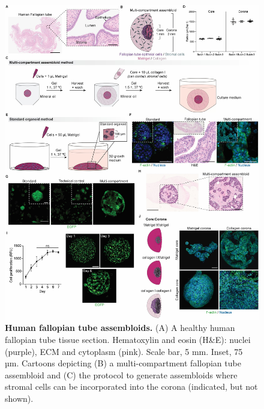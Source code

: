 \begin{refsection}
    \begin{figure}[p]
        \begin{center}
            \includegraphics[width=1\textwidth,height=0.85\textheight,keepaspectratio,clip,page=1]{figures/chapter4/fig_1.jpg}
            \captionsetup{font=small}
            \caption{\textbf{Human fallopian tube assembloids.} (A) A healthy human fallopian tube tissue section. Hematoxylin and eosin (H\&E): nuclei (purple), ECM and cytoplasm (pink). Scale bar, 5 mm. Inset, 75 µm. Cartoons depicting (B) a multi-compartment fallopian tube assembloid and (C) the protocol to generate assembloids where stromal cells can be incorporated into the corona (indicated, but not shown). }
            \label{chapter4_fig1}
        \end{center}
    \end{figure}
    

\end{refsection}

